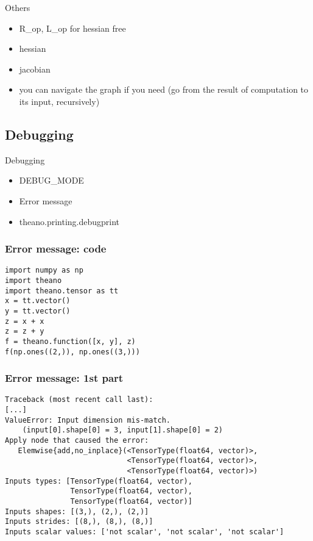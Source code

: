 \documentclass[utf8x,xcolor=pdftex,dvipsnames,table]{beamer}
\begin{document}
\begin{frame}{Others}
  \begin{itemize}
  \item R\_op, L\_op for hessian free
  \item hessian
  \item jacobian
  \item you can navigate the graph if you need
      (go from the result of computation to its input, recursively)
  \end{itemize}
\end{frame}

\subsection{Debugging}
\begin{frame}{Debugging}
  \begin{itemize}
  \item DEBUG\_MODE
  \item Error message
  \item theano.printing.debugprint
  \end{itemize}
\end{frame}

\begin{frame}[fragile]
  \frametitle{Error message: code}
\begin{lstlisting}
import numpy as np
import theano
import theano.tensor as tt
x = tt.vector()
y = tt.vector()
z = x + x
z = z + y
f = theano.function([x, y], z)
f(np.ones((2,)), np.ones((3,)))
\end{lstlisting}
\end{frame}

\begin{frame}[fragile]
  \frametitle{Error message: 1st part}

\begin{lstlisting}
Traceback (most recent call last):
[...]
ValueError: Input dimension mis-match.
    (input[0].shape[0] = 3, input[1].shape[0] = 2)
Apply node that caused the error:
   Elemwise{add,no_inplace}(<TensorType(float64, vector)>,
                            <TensorType(float64, vector)>,
                            <TensorType(float64, vector)>)
Inputs types: [TensorType(float64, vector),
               TensorType(float64, vector),
               TensorType(float64, vector)]
Inputs shapes: [(3,), (2,), (2,)]
Inputs strides: [(8,), (8,), (8,)]
Inputs scalar values: ['not scalar', 'not scalar', 'not scalar']
\end{lstlisting}
\end{frame}
\end{document}
